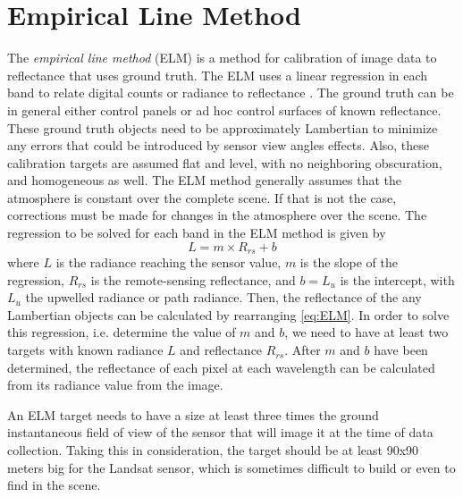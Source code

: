 \section{Empirical Line Method}
\label{subsec:ELM}
The {\it empirical line method} (ELM) is a method for calibration of image data to reflectance that uses ground truth. The ELM uses a linear regression in each band to relate digital counts or radiance to reflectance \cite{Schott,Smith:1999}. The ground truth can be in general  either control panels or ad hoc control surfaces of known reflectance. These ground truth objects need to be approximately Lambertian to minimize any errors that could be introduced by sensor view angles effects. Also, these calibration targets are assumed flat and level, with no neighboring obscuration, and homogeneous as well. The ELM method generally assumes that the atmosphere is constant over the complete scene. If that is not the case, corrections must be made for changes in the atmosphere over the scene. The regression to be solved for each band in the ELM method is given by
\begin{equation}
	\label{eq:ELM} 
	L = m\times R_{rs} + b
\end{equation}
where $L$ is the radiance reaching the sensor value, $m$ is the slope of the regression, $R_{rs}$ is the remote-sensing reflectance, and $b=L_u$ is the intercept, with $L_u$ the upwelled radiance or path radiance. Then, the reflectance of the any Lambertian objects can be calculated by rearranging \autoref{eq:ELM}. In order to solve this regression, i.e. determine the value of $m$ and $b$, we need to have at least two targets with known radiance $L$ and reflectance $R_{rs}$. After $m$ and $b$ have been determined, the reflectance of each pixel at each wavelength can be calculated from its radiance value from the image.

An ELM target needs to have a size at least three times the ground instantaneous field of view of the sensor that will image it at the time of data collection. Taking this in consideration, the target should be at least 90x90 meters big for the Landsat sensor, which is sometimes difficult to build or even to find in the scene. 

